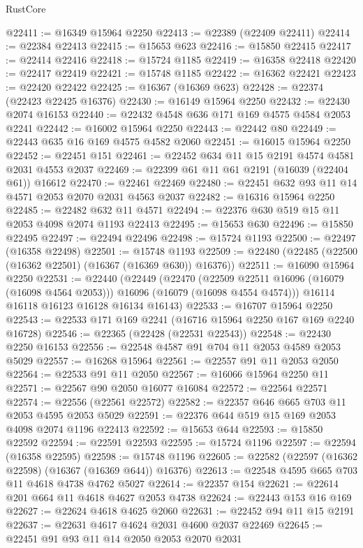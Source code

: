 \begin{lexlean}{RustCore}
\begin{coremodule}
@22411 := @16349 @15964 @2250
@22413 := @22389 (@22409 @22411)
@22414 := @22384 @22413
@22415 := @15653 @623
@22416 := @15850 @22415
@22417 := @22414 @22416
@22418 := @15724 @1185
@22419 := @16358 @22418
@22420 := @22417 @22419
@22421 := @15748 @1185
@22422 := @16362 @22421
@22423 := @22420 @22422
@22425 := @16367 (@16369 @623)
@22428 := @22374 (@22423 @22425 @16376)
@22430 := @16149 @15964 @2250
@22432 := @22430 @2074 @16153
@22440 := @22432 @4548 @636 @171 @169 @4575 @4584 @2053 @2241
@22442 := @16002 @15964 @2250
@22443 := @22442 @80
@22449 := @22443 @635 @16 @169 @4575 @4582 @2060
@22451 := @16015 @15964 @2250
@22452 := @22451 @151
@22461 := @22452 @634 @11 @15 @2191 @4574 @4581 @2031 @4553 @2037
@22469 := @22399 @61 @11 @61 @2191 (@16039 (@22404 @61)) @16612
@22470 := @22461 @22469
@22480 := @22451 @632 @93 @11 @14 @4571 @2053 @2070 @2031 @4563 @2037
@22482 := @16316 @15964 @2250
@22485 := @22482 @632 @11 @4571
@22494 := @22376 @630 @519 @15 @11 @2053 @4098 @2074 @1193 @22413
@22495 := @15653 @630
@22496 := @15850 @22495
@22497 := @22494 @22496
@22498 := @15724 @1193
@22500 := @22497 (@16358 @22498)
@22501 := @15748 @1193
@22509 := @22480 (@22485 (@22500 (@16362 @22501) (@16367 (@16369 @630)) @16376))
@22511 := @16090 @15964 @2250
@22531 := @22440
    (@22449
      (@22470
        (@22509 @22511 @16096 (@16079 (@16098 @4564 @2053)))
        @16096
        (@16079 (@16098 @4554 @4574)))
      @16114
      @16118
      @16123
      @16128
      @16134
      @16143)
@22533 := @16707 @15964 @2250
@22543 := @22533 @171 @169 @2241 (@16716 @15964 @2250 @167 @169 @2240 @16728)
@22546 := @22365 (@22428 (@22531 @22543))
@22548 := @22430 @2250 @16153
@22556 := @22548 @4587 @91 @704 @11 @2053 @4589 @2053 @5029
@22557 := @16268 @15964
@22561 := @22557 @91 @11 @2053 @2050
@22564 := @22533 @91 @11 @2050
@22567 := @16066 @15964 @2250 @11
@22571 := @22567 @90 @2050 @16077 @16084
@22572 := @22564 @22571
@22574 := @22556 (@22561 @22572)
@22582 := @22357 @646 @665 @703 @11 @2053 @4595 @2053 @5029
@22591 := @22376 @644 @519 @15 @169 @2053 @4098 @2074 @1196 @22413
@22592 := @15653 @644
@22593 := @15850 @22592
@22594 := @22591 @22593
@22595 := @15724 @1196
@22597 := @22594 (@16358 @22595)
@22598 := @15748 @1196
@22605 := @22582 (@22597 (@16362 @22598) (@16367 (@16369 @644)) @16376)
@22613 := @22548 @4595 @665 @703 @11 @4618 @4738 @4762 @5027
@22614 := @22357 @154
@22621 := @22614 @201 @664 @11 @4618 @4627 @2053 @4738
@22624 := @22443 @153 @16 @169
@22627 := @22624 @4618 @4625 @2060
@22631 := @22452 @94 @11 @15 @2191
@22637 := @22631 @4617 @4624 @2031 @4600 @2037 @22469
@22645 := @22451 @91 @93 @11 @14 @2050 @2053 @2070 @2031

\end{coremodule}
\end{lexlean}
